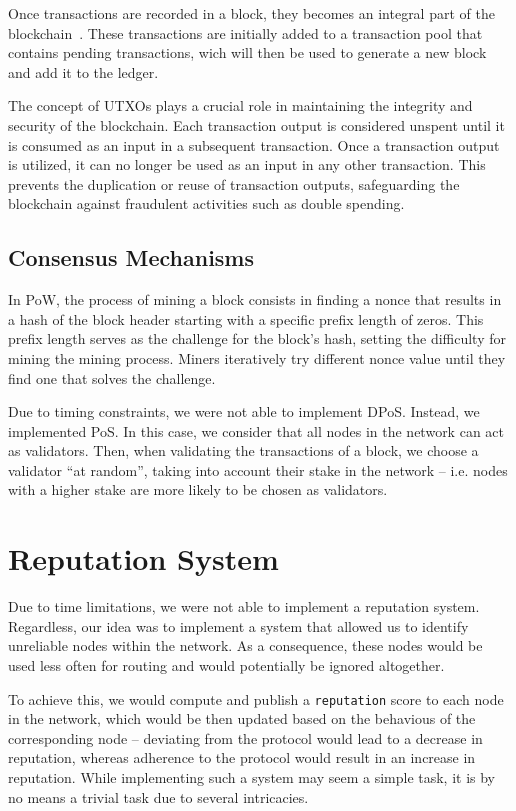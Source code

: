 \documentclass[a4paper, 11pt]{article}
\begin{document}
Once transactions are recorded in a block, they becomes an integral part of the blockchain~\cite{Transact84:online}.
These transactions are initially added to a transaction pool that contains pending transactions, wich 
will then be used to generate a new block and add it to the ledger.

The concept of \acsp{UTXO} plays a crucial role in maintaining the integrity and security of the blockchain. 
Each transaction output is considered unspent until it is consumed as an input in a subsequent transaction. 
Once a transaction output is utilized, it can no longer be used as an input in any other transaction. 
This prevents the duplication or reuse of transaction outputs, safeguarding the blockchain against fraudulent
activities such as double spending.

\subsection{Consensus Mechanisms}

In \acs{PoW}, the process of mining a block consists in finding a nonce that results in a hash of the 
block header starting with a specific prefix length of zeros. This prefix length serves as the challenge 
for the block's hash, setting the difficulty for mining the mining process. Miners iteratively try
different nonce value until they find one that solves the challenge.

Due to timing constraints, we were not able to implement \acs{DPoS}. Instead, we implemented \acs{PoS}.
In this case, we consider that all nodes in the network can act as validators. Then, when validating the
transactions of a block, we choose a validator ``at random'', taking into account their stake in the network -- i.e. 
nodes with a higher stake are more likely to be chosen as validators. 

\section{Reputation System}\label{sec:reputation}

Due to time limitations, we were not able to implement a reputation system.  Regardless, our idea was to
implement a system that allowed us to identify unreliable nodes within the network. As a consequence, these nodes 
would be used less often for routing and would potentially be ignored altogether.

To achieve this, we would compute and publish a \texttt{reputation} score to each node in the network, which would be then updated based
on the behavious of the corresponding node -- deviating from the protocol would lead to a decrease in reputation, whereas 
adherence to the protocol would result in an increase in reputation. While implementing such a system may seem a simple
task,  it is by no means a trivial task due to several intricacies.
\end{document}
